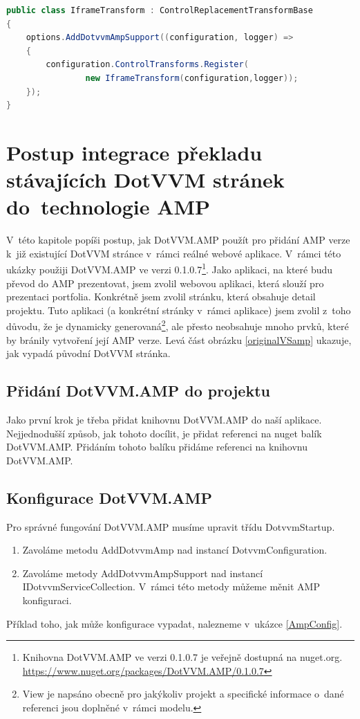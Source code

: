     \begin{lstlisting}[language=c#, caption=Ukazka možné implementace tranformace pro iframe,label=TransformRegistration,captionpos=t]
public class IframeTransform : ControlReplacementTransformBase
{
    options.AddDotvvmAmpSupport((configuration, logger) =>
    {
        configuration.ControlTransforms.Register(
                new IframeTransform(configuration,logger));
    });
}
\end{lstlisting}

\chapter{Postup integrace překladu stávajících DotVVM stránek do~technologie AMP}
V~této kapitole popíši postup, jak DotVVM.AMP použít pro přidání AMP verze k~již existující DotVVM stránce v~rámci reálné webové aplikace. V~rámci této ukázky použiji DotVVM.AMP ve verzi 0.1.0.7\footnote{\label{nuget}Knihovna DotVVM.AMP ve verzi 0.1.0.7 je veřejně dostupná na nuget.org.\newline
\url{https://www.nuget.org/packages/DotVVM.AMP/0.1.0.7}}. Jako aplikaci, na které budu převod do AMP prezentovat, jsem zvolil webovou aplikaci, která slouží pro prezentaci portfolia. Konkrétně jsem zvolil stránku, která obsahuje detail projektu. Tuto aplikaci (a konkrétní stránky v~rámci aplikace) jsem zvolil z~toho důvodu, že je dynamicky generovaná\footnote{View je napsáno obecně pro jakýkoliv projekt a specifické informace o~dané referenci jsou doplněné v~rámci modelu. }, ale přesto neobsahuje mnoho prvků, které by bránily vytvoření její AMP verze. Levá část obrázku \ref{originalVSamp} ukazuje, jak vypadá původní DotVVM stránka.

\section{Přidání DotVVM.AMP do projektu}
Jako první krok je třeba přidat knihovnu DotVVM.AMP do naší aplikace. Nejjednodušší způsob, jak tohoto docílit, je přidat referenci na nuget balík DotVVM.AMP. Přidáním tohoto balíku přidáme referenci na knihovnu DotVVM.AMP.
\section*{Konfigurace DotVVM.AMP}
Pro správné fungování DotVVM.AMP musíme upravit třídu DotvvmStartup.
\begin{enumerate}
    \item  Zavoláme metodu AddDotvvmAmp nad instancí DotvvmConfiguration.
    \item Zavoláme metody AddDotvvmAmpSupport nad instancí IDotvvmServiceCollection.\newline
    V~rámci této metody můžeme měnit AMP konfiguraci.
\end{enumerate}
Příklad toho, jak může konfigurace vypadat, nalezneme v~ukázce \ref{AmpConfig}.

